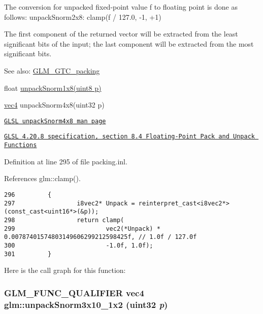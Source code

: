 The conversion for unpacked fixed-point value f to floating point is done as follows: unpackSnorm2x8: clamp(f / 127.0, -1, +1)

The first component of the returned vector will be extracted from the least significant bits of the input; the last component will be extracted from the most significant bits.

\begin{Desc}
\item[See also:]\hyperlink{group__gtc__packing}{GLM\_\-GTC\_\-packing} 

float \hyperlink{group__gtc__packing_g6f2bebf536fbf7c8b97d4b306bb3354e}{unpackSnorm1x8(uint8 p)} 

\hyperlink{group__core__types_g5881b1b022d7fd1b7218f5916532dd02}{vec4} unpackSnorm4x8(uint32 p) 

\href{http://www.opengl.org/sdk/docs/manglsl/xhtml/unpackSnorm4x8.xml}{\tt GLSL unpackSnorm4x8 man page} 

\href{http://www.opengl.org/registry/doc/GLSLangSpec.4.20.8.pdf}{\tt GLSL 4.20.8 specification, section 8.4 Floating-Point Pack and Unpack Functions} \end{Desc}


Definition at line 295 of file packing.inl.

References glm::clamp().

\begin{Code}\begin{verbatim}296         {
297                 i8vec2* Unpack = reinterpret_cast<i8vec2*>(const_cast<uint16*>(&p));
298                 return clamp(
299                         vec2(*Unpack) * 0.00787401574803149606299212598425f, // 1.0f / 127.0f
300                         -1.0f, 1.0f);
301         }
\end{verbatim}
\end{Code}




Here is the call graph for this function:\hypertarget{group__gtc__packing_g8b8bb827a3743ca553d8702d3e337101}{
\subsubsection[unpackSnorm3x10\_\-1x2]{\setlength{\rightskip}{0pt plus 5cm}GLM\_\-FUNC\_\-QUALIFIER vec4 glm::unpackSnorm3x10\_\-1x2 (uint32 {\em p})}}
\label{group__gtc__packing_g8b8bb827a3743ca553d8702d3e337101}


